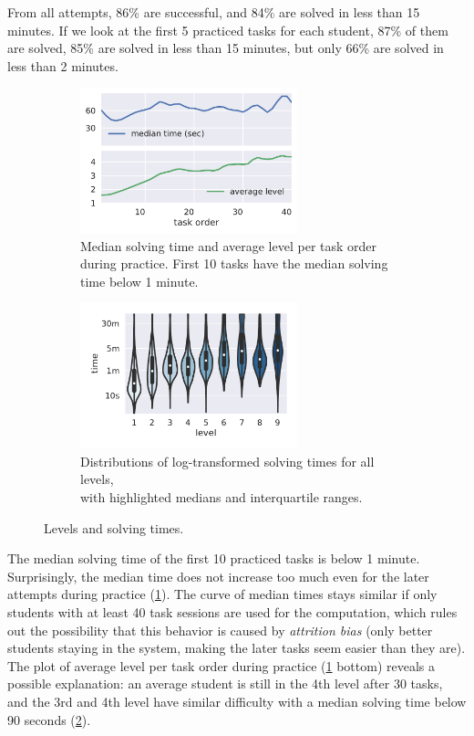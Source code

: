 From all attempts, 86\% are successful, and 84\% are solved in less than 15 minutes.
If we look at the first 5 practiced tasks for each student, 87\% of them are solved,
85\% are solved in less than 15 minutes, but only 66\% are solved in less than 2 minutes.


\begin{figure}[htb]
\centering
\begin{subfigure}{.48\textwidth}
\centering
\includegraphics[height=42mm]{img/median-time-order}
\caption{Median solving time and average level per task order during practice.
  First 10 tasks have the median solving time below 1 minute.}
\label{fig:solving-times-per-order}
\end{subfigure}
\begin{subfigure}{.51\textwidth}
\centering
\includegraphics[height=42mm]{img/levels-time}
\caption{Distributions of log-transformed solving times for all levels,\\
         with highlighted medians and interquartile ranges.}
\label{fig:levels-time}
\end{subfigure}
\caption{Levels and solving times.}
\label{fig:solving-times}
\end{figure}



The median solving time of the first 10 practiced tasks is below 1 minute.
Surprisingly, the median time does not increase too much even for the later
attempts during practice (\cref{fig:solving-times-per-order}).
The curve of median times stays similar
if only students with at least 40 task sessions are used for the computation,
which rules out the possibility that this behavior is caused by \emph{attrition bias}
(only better students staying in the system, making the later tasks seem easier than they are).
The plot of average level per task order during practice
(\cref{fig:solving-times-per-order} bottom) reveals a possible explanation:
an average student is still in the 4th level after 30 tasks,
and the 3rd and 4th level have similar difficulty with a median solving time below 90 seconds
(\cref{fig:levels-time}).



